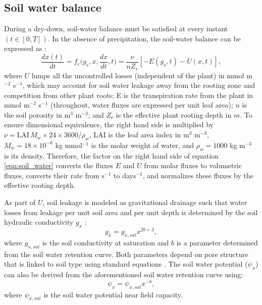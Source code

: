 \documentclass[utf8]{frontiersSCNS} %
\begin{document}
\subsection{Soil water balance}


During a dry-down, soil-water balance must be satisfied at every instant $(t \in [0,T])$. In the absence of precipitation, the soil-water balance can be expressed as \citep{rodriguez-iturbe_ecohydrology_2007}:
\begin{equation}
    \label{eqn:soil_water}
    \frac{dx(t)}{dt} = f_e\Big(g_s, x, \frac{dx}{dt}, t\Big) = \frac{\nu}{ n Z_r}[- E(g_s, t) - U(x, t)],
\end{equation}
where $U$ lumps all the uncontrolled losses (independent of the plant) in mmol m$^{-2}$ s$^{-1}$, which may account for soil water leakage away from the rooting zone and competition from other plant roots; E is the transpiration rate from the plant in mmol m$^{-2}$ s$^{-1}$ (throughout, water fluxes are expressed per unit leaf area);  $n$ is the soil porosity in m$^3$ m$^{-3}$; and $Z_r$ is the effective plant rooting depth in $m$. To ensure dimensional equivalence, the right hand side is multiplied by $\nu = \text{LAI} \, M_w \times 24 \times 3600 / \rho_w$, LAI is the leaf area index in m$^3$ m$^{-3}$, $M_w = 18 \times 10^{-6}$ kg mmol$^{-1}$ is the molar weight of water, and $\rho_w = 1000$ kg m$^{-3}$ is its density. Therefore, the factor on the right hand side of equation \ref{eqn:soil_water} converts the fluxes $E$ and $U$ from molar fluxes to volumetric fluxes, converts their rate from s$^{-1}$ to days${^{-1}}$, and normalizes these fluxes by the effective rooting depth.

As part of $U$, soil leakage is modeled as gravitational drainage such that water losses from leakage per unit soil area and per unit depth is determined by the soil hydraulic conductivity $g_x$ \citep{campbell_introduction_2012}:
\begin{equation}
    \label{eqn:soil_cond}
    g_x = g_{x,sat}x^{2b+3},
\end{equation}
where $g_{x,sat}$ is the soil conductivity at saturation and $b$ is a parameter determined from the soil water retention curve. Both parameters depend on pore structure that is linked to soil type using standard equations \citep{clapp_empirical_1978}. The soil water potential ($\psi_x$) can also be derived from the aforementioned soil water retention curve using:
\begin{equation}
    \label{eqn:Clapp_pot}
    \psi_x = \psi_{x,sat}x^{-b},
\end{equation}
where $\psi_{x,sat}$ is the soil water potential near field capacity.
\end{document}
